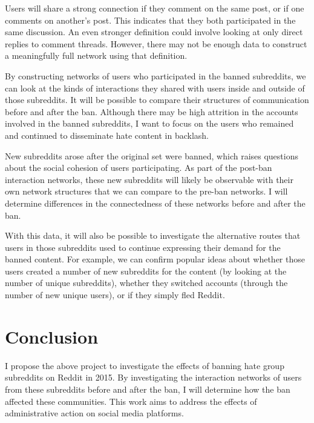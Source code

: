 \documentclass[twoside,twocolumn]{article}
\begin{document}
Users will share a strong connection if they comment on the same post, or if one comments on another's post. This indicates that they both participated in the same discussion. An even stronger definition could involve looking at only direct replies to comment threads. However, there may not be enough data to construct a meaningfully full network using that definition. 

By constructing networks of users who participated in the banned subreddits, we can look at the kinds of interactions they shared with users inside and outside of those subreddits. It will be possible to compare their structures of communication before and after the ban. Although there may be high attrition in the accounts involved in the banned subreddits, I want to focus on the users who remained and continued to disseminate hate content in backlash. 

New subreddits arose after the original set were banned, which raises questions about the social cohesion of users participating. As part of the post-ban interaction networks, these new subreddits will likely be observable with their own network structures that we can compare to the pre-ban networks. I will determine differences in the connectedness of these networks before and after the ban. 

With this data, it will also be possible to investigate the alternative routes that users in those subreddits used to continue expressing their demand for the banned content. For example, we can confirm popular ideas about whether those users created a number of new subreddits for the content (by looking at the number of unique subreddits), whether they switched accounts (through the number of new unique users), or if they simply fled Reddit. 

\section{Conclusion}

I propose the above project to investigate the effects of banning hate group subreddits on Reddit in 2015. By investigating the interaction networks of users from these subreddits before and after the ban, I will determine how the ban affected these communities. This work aims to address the effects of administrative action on social media platforms. 



\end{document}
